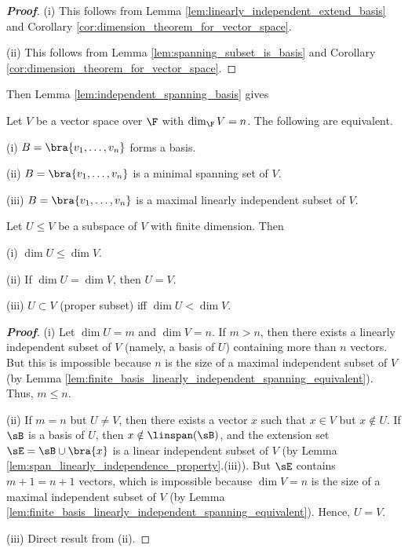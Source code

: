 \begin{proof}[\bf Proof]
\ben
\item [(i)] This follows from Lemma \ref{lem:linearly_independent_extend_basis} and Corollary \ref{cor:dimension_theorem_for_vector_space}. %
\item [(ii)] This follows from Lemma \ref{lem:spanning_subset_is_basis} and Corollary \ref{cor:dimension_theorem_for_vector_space}. %
\een
\end{proof}

Then Lemma \ref{lem:independent_spanning_basis} gives
\begin{lemma}\label{lem:finite_basis_linearly_independent_spanning_equivalent}
Let $V$ be a vector space over $\F$ with $\dim_\F V = n$. The following are equivalent.
\ben
\item [(i)] $B = \bra{v_1, \dots, v_n}$ forms a basis.
\item [(ii)] $B = \bra{v_1, \dots, v_n}$ is a minimal spanning set of $V$.
\item [(iii)] $B = \bra{v_1, \dots, v_n}$ is a maximal linearly independent subset of $V$.
\een
\end{lemma}


\begin{proposition}\label{pro:dimension_subspace_property}
Let $U\leq V$ be a subspace of $V$ with finite dimension. Then
\ben
\item [(i)] $\dim U\leq \dim V$.
\item [(ii)] If $\dim U = \dim V$, then $U = V$.
\item [(iii)] $U\subset V$ (proper subset) iff $\dim U < \dim V$.
\een
\end{proposition}

\begin{proof}[\bf Proof]
\ben
\item [(i)] Let $\dim U = m$ and $\dim V =n$. If $m>n$, then there exists a linearly independent subset of $V$ (namely, a basis of $U$) containing more than $n$ vectors. But this is impossible because $n$ is the size of a maximal independent subset of $V$ (by Lemma \ref{lem:finite_basis_linearly_independent_spanning_equivalent}). Thus, $m\leq n$.

\item [(ii)] If $m=n$ but $U\neq V$, then there exists a vector $x$ such that $x\in V$ but $x\notin U$. If $\sB$ is a basis of $U$, then $x\notin \linspan(\sB)$, and the extension set $\sE = \sB\cup \bra{x}$ is a linear independent subset of $V$ (by Lemma \ref{lem:span_linearly_independence_property}.(iii)). But $\sE$ contains $m+1 = n+1$ vectors, which is impossible because $\dim V =n$ is the size of a maximal independent subset of $V$ (by Lemma \ref{lem:finite_basis_linearly_independent_spanning_equivalent}). Hence, $U=V$.

\item [(iii)] Direct result from (ii).
\een
\end{proof}




